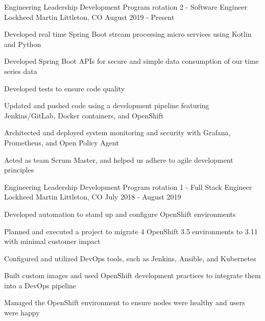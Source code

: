 


\begin{cventries}


\vspace{-.25em}
\cventry
{Engineering Leadership Development Program rotation 2 - Software Engineer} %
{Lockheed Martin} %
{Littleton, CO} %
{August 2019 - Present} %
{ %
\begin{cvitems}
\item {Developed real time Spring Boot stream processing micro services using Kotlin and Python}
\item {Developed Spring Boot APIs for secure and simple data consumption of our time series data}
\item {Developed tests to ensure code quality}
\item {Updated and pushed code using a development pipeline featuring Jenkins/GitLab, Docker containers, and OpenShift}
\item {Architected and deployed system monitoring and security with Grafana, Prometheus, and Open Policy Agent}
\item {Acted as team Scrum Master, and helped us adhere to agile development principles}
\end{cvitems}
}


\vspace{-1.25em}
\cventry
{Engineering Leadership Development Program rotation 1 - Full Stack Engineer} %
{Lockheed Martin} %
{Littleton, CO} %
{July 2018 - August 2019} %
{ %
\begin{cvitems}
\item {Developed automation to stand up and configure OpenShift environments}
\item {Planned and executed a project to migrate 4 OpenShift 3.5 environments to 3.11 with minimal customer impact}
\item {Configured and utilized DevOps tools, such as Jenkins, Ansible, and Kubernetes}
\item {Built custom images and used OpenShift development practices to integrate them into a DevOps pipeline}
\item {Managed the OpenShift environment to ensure nodes were healthy and users were happy}
\end{cvitems}
}


\end{cventries}
